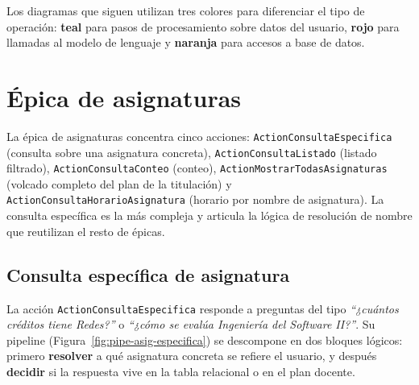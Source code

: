 Los diagramas que siguen utilizan tres colores para diferenciar el tipo de operación: \textcolor{usteal}{\textbf{teal}} para pasos de procesamiento sobre datos del usuario, \textcolor{usred}{\textbf{rojo}} para llamadas al modelo de lenguaje y \textcolor{usorange}{\textbf{naranja}} para accesos a base de datos.

\section{Épica de asignaturas}\label{sec:impl-asignaturas}

La épica de asignaturas concentra cinco acciones: \texttt{ActionConsultaEspecifica} (consulta sobre una asignatura concreta), \texttt{ActionConsultaListado} (listado filtrado), \texttt{ActionConsultaConteo} (conteo), \texttt{ActionMostrarTodasAsignaturas} (volcado completo del plan de la titulación) y \texttt{ActionConsultaHorarioAsignatura} (horario por nombre de asignatura). La consulta específica es la más compleja y articula la lógica de resolución de nombre que reutilizan el resto de épicas.

\subsection{Consulta específica de asignatura}

La acción \texttt{ActionConsultaEspecifica} responde a preguntas del tipo \textit{``¿cuántos créditos tiene Redes?''} o \textit{``¿cómo se evalúa Ingeniería del Software II?''}. Su pipeline (Figura~\ref{fig:pipe-asig-especifica}) se descompone en dos bloques lógicos: primero \textbf{resolver} a qué asignatura concreta se refiere el usuario, y después \textbf{decidir} si la respuesta vive en la tabla relacional o en el plan docente.

